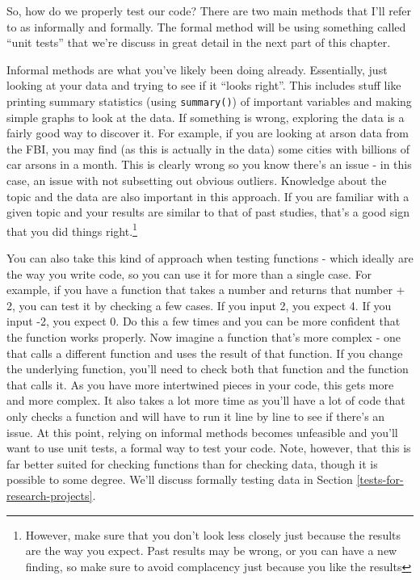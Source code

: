 \documentclass[
]{krantz}
\begin{document}
So, how do we properly test our code? There are two main methods that I'll refer to as informally and formally. The formal method will be using something called ``unit tests'' that we're discuss in great detail in the next part of this chapter.

Informal methods are what you've likely been doing already. Essentially, just looking at your data and trying to see if it ``looks right''. This includes stuff like printing summary statistics (using \texttt{summary()}) of important variables and making simple graphs to look at the data. If something is wrong, exploring the data is a fairly good way to discover it. For example, if you are looking at arson data from the FBI, you may find (as this is actually in the data) some cities with billions of car arsons in a month. This is clearly wrong so you know there's an issue - in this case, an issue with not subsetting out obvious outliers. Knowledge about the topic and the data are also important in this approach. If you are familiar with a given topic and your results are similar to that of past studies, that's a good sign that you did things right.\footnote{However, make sure that you don't look less closely just because the results are the way you expect. Past results may be wrong, or you can have a new finding, so make sure to avoid complacency just because you like the results}

You can also take this kind of approach when testing functions - which ideally are the way you write code, so you can use it for more than a single case. For example, if you have a function that takes a number and returns that number + 2, you can test it by checking a few cases. If you input 2, you expect 4. If you input -2, you expect 0. Do this a few times and you can be more confident that the function works properly. Now imagine a function that's more complex - one that calls a different function and uses the result of that function. If you change the underlying function, you'll need to check both that function and the function that calls it. As you have more intertwined pieces in your code, this gets more and more complex. It also takes a lot more time as you'll have a lot of code that only checks a function and will have to run it line by line to see if there's an issue. At this point, relying on informal methods becomes unfeasible and you'll want to use unit tests, a formal way to test your code. Note, however, that this is far better suited for checking functions than for checking data, though it is possible to some degree. We'll discuss formally testing data in Section \ref{tests-for-research-projects}.
\end{document}
